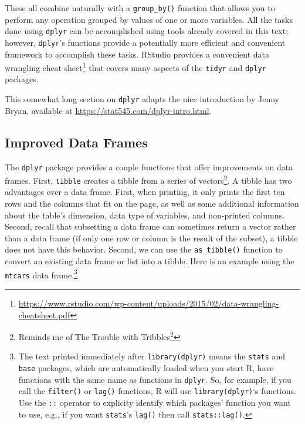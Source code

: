\documentclass[
]{krantz}
\renewcommand{\href}[2]{#2\footnote{\url{#1}}}
\begin{document}
These all combine naturally with a \texttt{group\_by()} function that allows you to perform any operation grouped by values of one or more variables. All the tasks done using \texttt{dplyr} can be accomplished using tools already covered in this text; however, \texttt{dplyr}'s functions provide a potentially more efficient and convenient framework to accomplish these tasks. RStudio provides a convenient \href{https://www.rstudio.com/wp-content/uploads/2015/02/data-wrangling-cheatsheet.pdf}{data wrangling cheat sheet} that covers many aspects of the \texttt{tidyr} and \texttt{dplyr} packages.

This somewhat long section on \texttt{dplyr} adapts the nice introduction by Jenny Bryan, available at \url{https://stat545.com/dplyr-intro.html}.

\hypertarget{improved-data-frames}{%
\subsection{Improved Data Frames}\label{improved-data-frames}}

The \texttt{dplyr} package provides a couple functions that offer improvements on data frames. First, \texttt{tibble} creates a tibble from a series of vectors\footnote{Reminds me of \href{https://en.wikipedia.org/wiki/The_Trouble_with_Tribbles}{The Trouble with Tribbles}}. A tibble has two advantages over a data frame. First, when printing, it only prints the first ten rows and the columns that fit on the page, as well as some additional information about the table's dimension, data type of variables, and non-printed columns. Second, recall that subsetting a data frame can sometimes return a vector rather than a data frame (if only one row or column is the result of the subset), a tibble does not have this behavior. Second, we can use the \texttt{as\_tibble()} function to convert an existing data frame or list into a tibble. Here is an example using the \texttt{mtcars} data frame.\footnote{The text printed immediately after \texttt{library(dplyr)} means the \texttt{stats} and \texttt{base} packages, which are automatically loaded when you start R, have functions with the same name as functions in \texttt{dplyr}. So, for example, if you call the \texttt{filter()} or \texttt{lag()} functions, R will use \texttt{library(dplyr)}`s functions. Use the \texttt{::} operator to explicity identify which packages' function you want to use, e.g., if you want \texttt{stats}'s \texttt{lag()} then call \texttt{stats::lag()}.}
\end{document}

